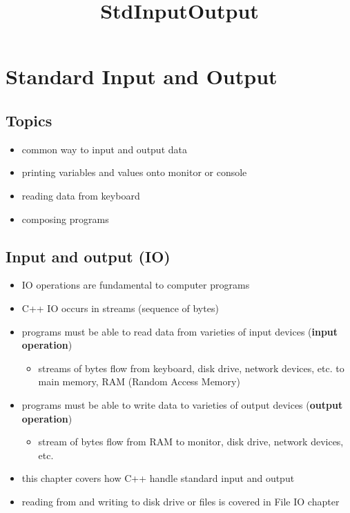 \documentclass[11pt]{article}
\title{StdInputOutput}
\providecommand{\tightlist}{%
      \setlength{\itemsep}{0pt}\setlength{\parskip}{0pt}}
\begin{document}
    
    \maketitle
    
    

    
    \hypertarget{standard-input-and-output}{%
\section{Standard Input and Output}\label{standard-input-and-output}}

\hypertarget{topics}{%
\subsection{Topics}\label{topics}}

\begin{itemize}
\tightlist
\item
  common way to input and output data
\item
  printing variables and values onto monitor or console
\item
  reading data from keyboard
\item
  composing programs
\end{itemize}

    \hypertarget{input-and-output-io}{%
\subsection{Input and output (IO)}\label{input-and-output-io}}

\begin{itemize}
\tightlist
\item
  IO operations are fundamental to computer programs
\item
  C++ IO occurs in streams (sequence of bytes)
\item
  programs must be able to read data from varieties of input devices
  (\textbf{input operation})

  \begin{itemize}
  \tightlist
  \item
    streams of bytes flow from keyboard, disk drive, network devices,
    etc. to main memory, RAM (Random Access Memory)
  \end{itemize}
\item
  programs must be able to write data to varieties of output devices
  (\textbf{output operation})

  \begin{itemize}
  \tightlist
  \item
    stream of bytes flow from RAM to monitor, disk drive, network
    devices, etc.
  \end{itemize}
\item
  this chapter covers how C++ handle standard input and output
\item
  reading from and writing to disk drive or files is covered in File IO
  chapter
\end{itemize}
\end{document}
